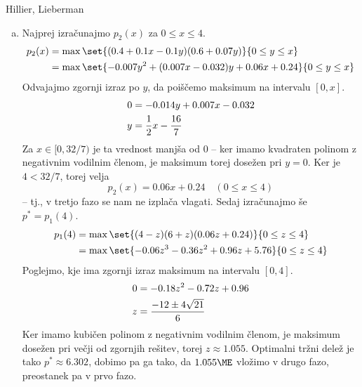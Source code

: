 \begin{naloga}{Hillier, Lieberman}{\cite[Problem~11.3-8]{hl}}
\begin{odgovor}
\begin{enumerate}[(a)]
\item Najprej izračunajmo $p_2(x)$ za $0 \le x \le 4$.
\begin{align*}
p_2(x) &= \max\set{(0.4 + 0.1x - 0.1y) (0.6 + 0.07 y)}{0 \le y \le x} \\
&= \max\set{-0.007y^2 + (0.007x - 0.032) y + 0.06 x + 0.24}{0 \le y \le x}
\end{align*}
Odvajajmo zgornji izraz po $y$, da poiščemo maksimum na intervalu $[0, x]$.
\begin{align*}
0 &= -0.014y + 0.007x - 0.032 \\
y &= {1 \over 2} x - {16 \over 7}
\end{align*}
Za $x \in [0, 32/7)$ je ta vrednost manjša od $0$
-- ker imamo kvadraten polinom z negativnim vodilnim členom,
je maksimum torej dosežen pri $y = 0$.
Ker je $4 < 32/7$, torej velja
$$
p_2(x) = 0.06 x + 0.24 \quad (0 \le x \le 4)
$$
-- tj., v tretjo fazo se nam ne izplača vlagati.
Sedaj izračunajmo še $p^* = p_1(4)$.
\begin{align*}
p_1(4) &= \max\set{(4-z)(6+z) (0.06 z + 0.24)}{0 \le z \le 4} \\
&= \max\set{-0.06z^3 - 0.36z^2 + 0.96z + 5.76}{0 \le z \le 4}
\end{align*}
Poglejmo, kje ima zgornji izraz maksimum na intervalu $[0, 4]$.
\begin{align*}
0 &= -0.18z^2 - 0.72z + 0.96 \\
z &= {-12 \pm 4\sqrt{21} \over 6}
\end{align*}
Ker imamo kubičen polinom z negativnim vodilnim členom,
je maksimum dosežen pri večji od zgornjih rešitev,
torej $z \approx 1.055$.
Optimalni tržni delež je tako $p^* \approx 6.302$,
dobimo pa ga tako, da $1.055 \ME$ vložimo v drugo fazo,
preostanek pa v prvo fazo.
\end{enumerate}
\end{odgovor}
\end{naloga}
